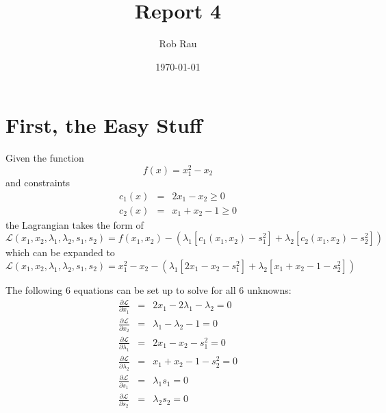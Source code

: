 \documentclass[12pt,parskip=full]{article}
\newcommand{\Lagr}{\mathcal{L}}
\numberwithin{subsection}{section}
\begin{document}
	\vspace{-2ex}
	\title{Report 4\vspace{-3.5ex}}
	\author{Rob Rau\vspace{-4ex}}
	\date{\today\vspace{-4ex}}
	\maketitle

	\section{First, the Easy Stuff}
		
		Given the function
		\begin{equation}
			f(x) = x_1^2 - x_2
		\end{equation}
		and constraints
		\begin{eqnarray}
			c_1(x) &=& 2x_1 - x_2 \geq 0 \\
			c_2(x) &=& x_1 + x_2 - 1 \geq 0
		\end{eqnarray}
		the Lagrangian takes the form of
		\begin{equation}
			\Lagr(x_1, x_2, \lambda_1, \lambda_2, s_1, s_2) = 
				f(x_1, x_2) - \left(\lambda_1\left[c_1(x_1, x_2) - s_1^2\right] + 
				\lambda_2\left[c_2(x_1, x_2) - s_2^2\right]\right)
		\end{equation}
		which can be expanded to
		\begin{equation}
			\Lagr(x_1, x_2, \lambda_1, \lambda_2, s_1, s_2) = 
				x_1^2 - x_2 - \left(\lambda_1\left[2x_1 - x_2 - s_1^2\right] + 
				\lambda_2\left[x_1 + x_2 - 1 - s_2^2\right]\right)
		\end{equation}

		The following 6 equations can be set up to solve for all 6 unknowns:
		\begin{eqnarray}
			\frac{\partial\Lagr}{\partial x_1} &=& 2x_1 - 2\lambda_1 - \lambda_2 = 0 \\
			\frac{\partial\Lagr}{\partial x_2} &=& \lambda_1 - \lambda_2 - 1 = 0 \\
			\frac{\partial\Lagr}{\partial \lambda_1} &=& 2x_1 - x_2 - s_1^2 = 0 \\
			\frac{\partial\Lagr}{\partial \lambda_2} &=& x_1 + x_2 - 1 - s_2^2 = 0 \\
			\frac{\partial\Lagr}{\partial s_1} &=& \lambda_1 s_1 = 0 \\
			\frac{\partial\Lagr}{\partial s_2} &=& \lambda_2 s_2 = 0
		\end{eqnarray}
\end{document}
